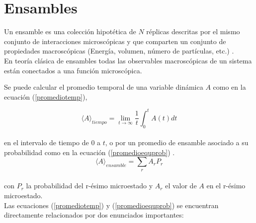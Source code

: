 \section{Ensambles}

Un ensamble es una colección hipotética de $N$ réplicas descritas por el mismo conjunto de interacciones microscópicas y que comparten un conjunto de propiedades macroscópicas (Energía, volumen, número de partículas, etc.) \cite{tuckerman2010}.\\

En teoría clásica de ensambles todas las observables macroscópicas de un sistema están conectados a una función microscópica. 

Se puede calcular el promedio temporal de una variable dinámica $A$ como en la ecuación (\ref{promediotemp}), 

\begin{equation} \label{promediotemp}
    \langle A\rangle_{tiempo} = \lim_{t\to\infty}\frac{1}{t}\int_0^t A(t)dt
\end{equation}\\
en el intervalo de tiempo de 0 a $t$,
o por un promedio de ensamble asociado a su probabilidad como en la ecuación (\ref{promedioequprob}) \cite{tuckerman2010}. \\
\begin{equation} \label{promedioequprob}
    \langle A\rangle_{ensamble} =\sum_r A_r P_r
\end{equation}\\
con $P_r$ la probabilidad del r-ésimo microestado y $A_r$ el valor de $A$ en el r-ésimo microestado.\\

Las ecuaciones (\ref{promediotemp}) y (\ref{promedioequprob}) se encuentran directamente relacionados por dos enunciados importantes:

